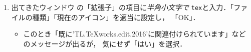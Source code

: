 \documentclass{ltjsarticle}
\begin{document}
\begin{enumerate}
\begin{enumerate}
  \item 出てきたウィンドウ%
    の「拡張子」の項目に\emph{半角小文字で}
    \texttt{tex}と入力．「ファイルの種類」「現在のアイコン」を適当に設定し，
    「OK」．
    \begin{itemize}
    \item このとき「既に'TL.TeXworks.edit.2016'に関連付けられています」などのメッセージが出るが，
      気にせず「はい」を選択．
    \end{itemize}
  \end{enumerate}
\end{enumerate}
\end{document}
